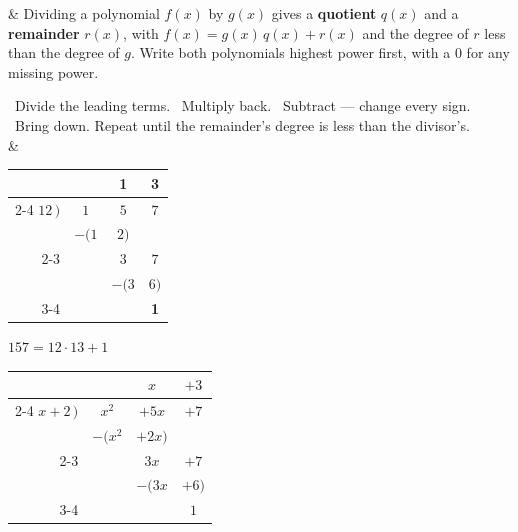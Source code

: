 \documentclass[10pt]{article}
\newcommand{\dstrut}{\rule[-3.5pt]{0pt}{12pt}}
\begin{document}
\small
\begin{guidednotes}
 &
Dividing a polynomial $f(x)$ by $g(x)$ gives a \textbf{quotient} $q(x)$ and a
\textbf{remainder} $r(x)$, with $f(x) = g(x)\,q(x) + r(x)$ and the degree of $r$ less than
the degree of $g$. Write both polynomials highest power first, with a $0$ for any missing power.

\vspace{3pt}
\ Divide the leading terms. \quad {}\ Multiply back. \quad
{}\ Subtract --- change every sign. \quad {}\ Bring down. Repeat until
the remainder's degree is less than the divisor's.
\\
& \begin{minipage}[c]{0.36\linewidth}\centering
{\setlength{\tabcolsep}{2.5pt}\begin{tabular}{@{}>{\dstrut}r@{\,}ccc@{}}
            &        & \textbf{\color{plum}1} & \textbf{\color{plum}3} \\ \cline{2-4}
 $12\,\big)$ & $1$    & $5$    & $7$    \\
            & $-(1$  & $2)$   &        \\ \cline{2-3}
            &        & $3$    & $7$    \\
            &        & $-(3$  & $6)$   \\ \cline{3-4}
            &        &        & \textbf{\color{redacc}1} \\
\end{tabular}}

\vspace{3pt}
$157 = 12 \cdot 13 + 1$
\end{minipage}\hfill
\begin{minipage}[c]{0.6\linewidth}\centering
{\setlength{\tabcolsep}{2.5pt}\begin{tabular}{@{}>{\dstrut}r@{\,}ccc@{}}
              &          & \textbf{\color{plum}$x$} & \textbf{\color{plum}$+3$} \\ \cline{2-4}
 $x+2\,\big)$ & $x^2$    & $+5x$    & $+7$    \\
              & $-(x^2$  & $+2x)$   &         \\ \cline{2-3}
              &          & $3x$     & $+7$    \\
              &          & $-(3x$   & $+6)$   \\ \cline{3-4}
              &          &          & \textbf{\color{redacc}$1$} \\
\end{tabular}}


\end{minipage}
\end{guidednotes}
\end{document}
